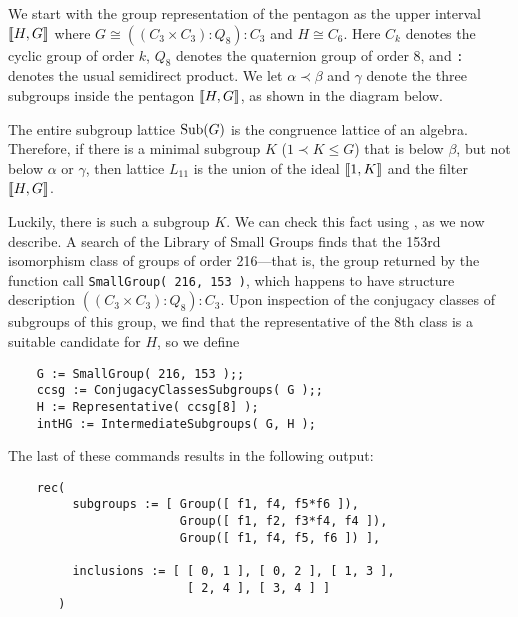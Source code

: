 We start with the group representation of the pentagon as the upper
interval $\llbracket H, G\rrbracket$ 
where $G \cong ((C_3 \times C_3) : Q_8) : C_3$ and 
$H \cong C_6$.  Here $C_k$ denotes the cyclic group of order $k$, $Q_8$ denotes the
quaternion group of order 8, and {\tt :} denotes the usual semidirect product.
We let $\alpha \prec \beta$ and $\gamma$ denote the three
subgroups inside the pentagon $\llbracket H, G \rrbracket$, as shown in the diagram below.  

\begin{center}
\end{center}
The entire subgroup lattice
$\operatorname{Sub}(G)$ is the congruence lattice of an algebra. Therefore, if there is a minimal
subgroup $K$ ($1 \prec K \leq G$) that is below $\beta$, but not below 
$\alpha$ or $\gamma$, then lattice $L_{11}$ is the 
union of the ideal $\llbracket 1, K\rrbracket$ and the filter $\llbracket H, G\rrbracket$.


Luckily, there is
such a subgroup $K$. We can check this fact using \gap, as we now describe.
A search of the \gap Library of Small Groups finds that the 153rd
isomorphism class of groups of order 216---that is, the group 
returned by the function call {\tt SmallGroup( 216, 153 )}, which happens to have
structure description $((C_3 \times C_3) : Q_8) : C_3$.
Upon inspection of the conjugacy classes of subgroups of this group, we 
find that the representative of the 8th class is a suitable candidate for 
$H$, so we define 

{\small 
\begin{verbatim}
    G := SmallGroup( 216, 153 );;    
    ccsg := ConjugacyClassesSubgroups( G );;
    H := Representative( ccsg[8] );
    intHG := IntermediateSubgroups( G, H );
\end{verbatim}
}

\noindent 
The last of these commands results in the following output:

{\small 
\begin{verbatim}
    rec( 
         subgroups := [ Group([ f1, f4, f5*f6 ]), 
                        Group([ f1, f2, f3*f4, f4 ]), 
                        Group([ f1, f4, f5, f6 ]) ], 

         inclusions := [ [ 0, 1 ], [ 0, 2 ], [ 1, 3 ], 
                         [ 2, 4 ], [ 3, 4 ] ] 
       )
\end{verbatim}
}

